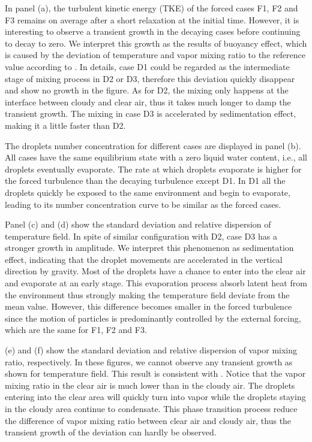 In panel (a), the turbulent kinetic energy (TKE) of the forced cases F1, F2 and
F3 remains on average after a short relaxation at the initial time. However, it
is interesting to observe a transient growth in the decaying cases before
continuing to decay to zero. We interpret this growth as the results of
buoyancy effect, which is caused by the deviation of temperature and vapor
mixing ratio to the reference value according to . In
details, case D1 could be regarded as the intermediate stage of mixing process
in D2 or D3, therefore this deviation quickly disappear and show no growth in
the figure. As for D2, the mixing only happens at the interface between cloudy
and clear air, thus it takes much longer to damp the transient growth. The
mixing in case D3 is accelerated by sedimentation effect, making it a little
faster than D2.

The droplets number concentration for different cases are displayed in panel
(b). All cases have the same equilibrium state with a zero liquid water
content, i.e., all droplets eventually evaporate. The rate at which droplets
evaporate is higher for the forced turbulence than the decaying turbulence
except D1. In D1 all the droplets quickly be exposed to the same environment
and begin to evaporate, leading to its number concentration curve to be similar
as the forced cases.

Panel (c) and (d) show the standard deviation and relative dispersion of
temperature field. In spite of similar configuration with D2, case D3 has a
stronger growth in amplitude. We interpret this phenomenon as sedimentation
effect, indicating that the droplet movements are accelerated in the vertical
direction by gravity. Most of the droplets have a chance to enter into the
clear air and evaporate at an early stage. This evaporation process absorb
latent heat from the environment thus strongly making the temperature field
deviate from the mean value. However, this difference becomes smaller in the
forced turbulence since the motion of particles is predominantly controlled by
the external forcing, which are the same for F1, F2 and F3.

 (e) and (f) show the standard deviation and relative
dispersion of vapor mixing ratio, respectively. In these figures, we cannot
observe any transient growth as shown for temperature field. This result is
consistent with \cite{Kumar2014Lagrangian}. Notice that the vapor mixing ratio in the clear
air is much lower than in the cloudy air. The droplets entering into the clear
area will quickly turn into vapor while the droplets staying in the cloudy area
continue to condensate. This phase transition process reduce the difference of
vapor mixing ratio between clear air and cloudy air, thus the transient growth
of the deviation can hardly be observed.

